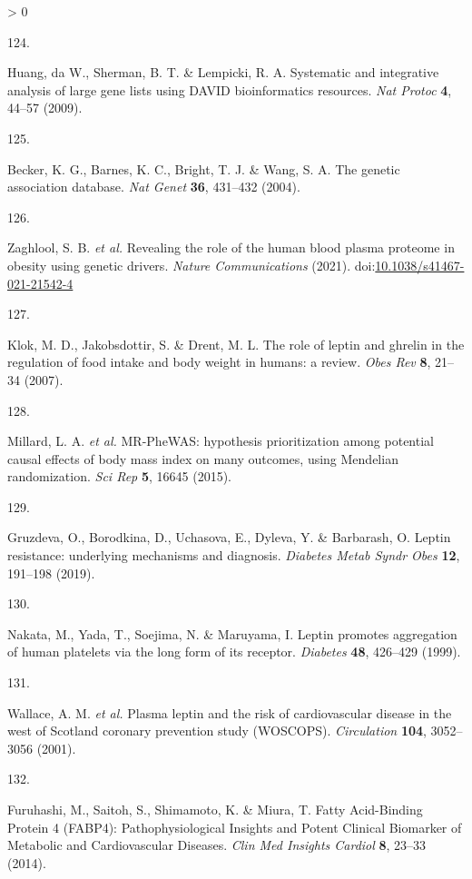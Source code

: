 \documentclass[11pt,twoside]{bristolthesis}
\newlength{\cslhangindent}
\newlength{\csllabelwidth}
\newenvironment{CSLReferences}[2] %
 {%
  \setlength{\parindent}{0pt}
  \ifodd #1 \everypar{\setlength{\hangindent}{\cslhangindent}}\ignorespaces\fi
  \ifnum #2 > 0
  \setlength{\parskip}{#2\baselineskip}
  \fi
 }%
 {}
\newcommand{\CSLLeftMargin}[1]{\parbox[t]{\csllabelwidth}{#1}}
\newcommand{\CSLRightInline}[1]{\parbox[t]{\linewidth - \csllabelwidth}{#1}\break}
\begin{document}
\begin{CSLReferences}{0}{0}
\leavevmode\hypertarget{ref-Huang2009}{}%
\CSLLeftMargin{124. }
\CSLRightInline{Huang, da W., Sherman, B. T. \& Lempicki, R. A. {Systematic and integrative analysis of large gene lists using DAVID bioinformatics resources}. \emph{Nat Protoc} \textbf{4}, 44--57 (2009).}

\leavevmode\hypertarget{ref-Becker2004a}{}%
\CSLLeftMargin{125. }
\CSLRightInline{Becker, K. G., Barnes, K. C., Bright, T. J. \& Wang, S. A. {The genetic association database}. \emph{Nat Genet} \textbf{36}, 431--432 (2004).}

\leavevmode\hypertarget{ref-Zaghlool2021}{}%
\CSLLeftMargin{126. }
\CSLRightInline{Zaghlool, S. B. \emph{et al.} {Revealing the role of the human blood plasma proteome in obesity using genetic drivers}. \emph{Nature Communications} (2021). doi:\href{https://doi.org/10.1038/s41467-021-21542-4}{10.1038/s41467-021-21542-4}}

\leavevmode\hypertarget{ref-Klok2007}{}%
\CSLLeftMargin{127. }
\CSLRightInline{Klok, M. D., Jakobsdottir, S. \& Drent, M. L. {The role of leptin and ghrelin in the regulation of food intake and body weight in humans: a review}. \emph{Obes Rev} \textbf{8}, 21--34 (2007).}

\leavevmode\hypertarget{ref-Millard2015}{}%
\CSLLeftMargin{128. }
\CSLRightInline{Millard, L. A. \emph{et al.} {MR-PheWAS: hypothesis prioritization among potential causal effects of body mass index on many outcomes, using Mendelian randomization}. \emph{Sci Rep} \textbf{5}, 16645 (2015).}

\leavevmode\hypertarget{ref-Gruzdeva2019a}{}%
\CSLLeftMargin{129. }
\CSLRightInline{Gruzdeva, O., Borodkina, D., Uchasova, E., Dyleva, Y. \& Barbarash, O. {Leptin resistance: underlying mechanisms and diagnosis}. \emph{Diabetes Metab Syndr Obes} \textbf{12}, 191--198 (2019).}

\leavevmode\hypertarget{ref-Nakata1999}{}%
\CSLLeftMargin{130. }
\CSLRightInline{Nakata, M., Yada, T., Soejima, N. \& Maruyama, I. {Leptin promotes aggregation of human platelets via the long form of its receptor}. \emph{Diabetes} \textbf{48}, 426--429 (1999).}

\leavevmode\hypertarget{ref-Wallace2001}{}%
\CSLLeftMargin{131. }
\CSLRightInline{Wallace, A. M. \emph{et al.} {Plasma leptin and the risk of cardiovascular disease in the west of Scotland coronary prevention study (WOSCOPS)}. \emph{Circulation} \textbf{104}, 3052--3056 (2001).}

\leavevmode\hypertarget{ref-Furuhashi2014}{}%
\CSLLeftMargin{132. }
\CSLRightInline{Furuhashi, M., Saitoh, S., Shimamoto, K. \& Miura, T. {Fatty Acid-Binding Protein 4 (FABP4): Pathophysiological Insights and Potent Clinical Biomarker of Metabolic and Cardiovascular Diseases}. \emph{Clin Med Insights Cardiol} \textbf{8}, 23--33 (2014).}


\end{CSLReferences}
\end{document}
